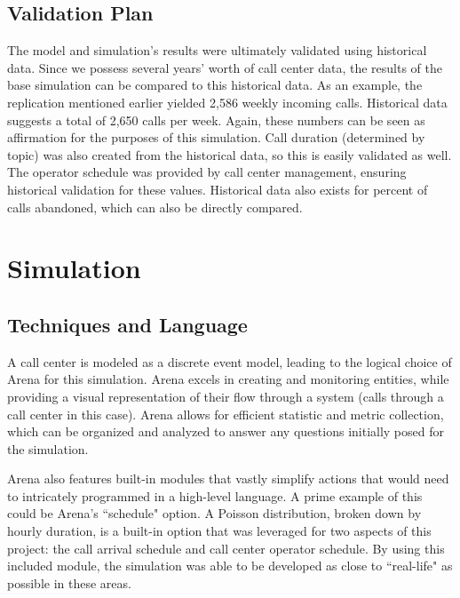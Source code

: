 \documentclass[12pt,twocolumn]{article}
\begin{document}
	
	\subsection{Validation Plan}
	
The model and simulation's results were ultimately validated using historical data.  Since we possess several years' worth of call center data, the results of the base simulation can be compared to this historical data.  As an example, the replication mentioned earlier yielded 2,586 weekly incoming calls.  Historical data suggests a total of 2,650 calls per week.  Again, these numbers can be seen as affirmation for the purposes of this simulation.  Call duration (determined by topic) was also created from the historical data, so this is easily validated as well.  The operator schedule was provided by call center management, ensuring historical validation for these values.  Historical data also exists for percent of calls abandoned, which can also be directly compared.
	
\section{Simulation}

	\subsection{Techniques and Language}
	
A call center is modeled as a discrete event model, leading to the logical choice of Arena for this simulation.  Arena excels in creating and monitoring entities, while providing a visual representation of their flow through a system (calls through a call center in this case).  Arena allows for efficient statistic and metric collection, which can be organized and analyzed to answer any questions initially posed for the simulation.

\par

Arena also features built-in modules that vastly simplify actions that would need to intricately programmed in a high-level language.  A prime example of this could be Arena's ``schedule" option.  A Poisson distribution, broken down by hourly duration, is a built-in option that was leveraged for two aspects of this project:  the call arrival schedule and call center operator schedule.  By using this included module, the simulation was able to be developed as close to ``real-life" as possible in these areas.
	
\end{document}
